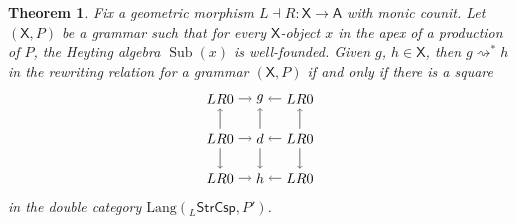 \documentclass{amsart}
\newcommand{\A}{\cat{A}}
\newcommand{\X}{\cat{X}}
\newcommand{\StrCsp}{\cat{StrCsp}}
\newcommand{\Lang}{\mathrm{Lang}}
\newcommand{\cat}[1]{\mathsf{#1}}
\newcommand{\from}{\colon}
\newcommand{\deriv}[2]{#1 \rightsquigarrow^\ast #2}
\DeclareMathOperator{\Sub}{Sub}
\newtheorem{theorem}{Theorem}[section]
\theoremstyle{remark}
\theoremstyle{definition}
\begin{document}
\begin{theorem} \label{thm:inductive-rewriting}
  Fix a geometric morphism $ L \dashv R \from \X \to \A $
  with monic counit. Let $ ( \X , P ) $ be a grammar such
  that for every $ \X $-object $ x $ in the apex of a
  production of $ P $, the Heyting algebra $ \Sub (x) $ is
  well-founded. Given $ g $, $ h \in \X $, then
  $ \deriv{g}{h} $ in the rewriting relation for a grammar
  $ ( \X , P ) $ if and only if there is a square
  \[
    \begin{tikzpicture}
      \node (1t) at (0,2) {$ LR 0 $};
      \node (2t) at (1,2) {$ g $};
      \node (3t) at (2,2) {$ LR 0 $};
      \node (1m) at (0,1) {$ LR 0 $};
      \node (2m) at (1,1) {$ d $};
      \node (3m) at (2,1) {$ LR 0 $};
      \node (1b) at (0,0) {$ LR 0 $};
      \node (2b) at (1,0) {$ h $};
      \node (3b) at (2,0) {$ LR 0 $};
      \draw [->] (1t) to node [] {\scriptsize{$  $}} (2t);
      \draw [->] (3t) to node [] {\scriptsize{$  $}} (2t);
      \draw [->] (1m) to node [] {\scriptsize{$  $}} (2m);
      \draw [->] (3m) to node [] {\scriptsize{$  $}} (2m);
      \draw [->] (1b) to node [] {\scriptsize{$  $}} (2b);
      \draw [->] (3b) to node [] {\scriptsize{$  $}} (2b);
      \draw [->] (1m) to node [] {\scriptsize{$  $}} (1t);
      \draw [->] (1m) to node [] {\scriptsize{$  $}} (1b);
      \draw [->] (2m) to node [] {\scriptsize{$  $}} (2t);
      \draw [->] (2m) to node [] {\scriptsize{$  $}} (2b);
      \draw [->] (3m) to node [] {\scriptsize{$  $}} (3t);
      \draw [->] (3m) to node [] {\scriptsize{$  $}} (3b);
    \end{tikzpicture}
  \]
  in the double category $ \Lang ( _{L}\StrCsp , P' ) $.
\end{theorem}
\end{document}
